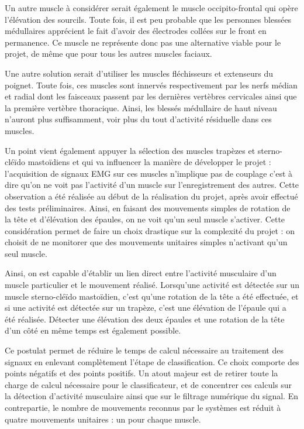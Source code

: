 \documentclass[letterpaper, twoside, 12pt, memoire, creativecommons, hyperref]{thETS}
\begin{document}
Un autre muscle à considérer serait également le muscle occipito-frontal qui opère l'élévation des sourcils. Toute fois, il est peu probable que les personnes blessées médullaires apprécient le fait d'avoir des électrodes collées sur le front en permanence. Ce muscle ne représente donc pas une alternative viable pour le projet, de même que pour tous les autres muscles faciaux.

Une autre solution serait d'utiliser les muscles fléchisseurs et extenseurs du poignet. Toute fois, ces muscles sont innervés respectivement par les nerfs médian et radial dont les faisceaux passent par les dernières vertèbres cervicales ainsi que la première vertèbre thoracique. Ainsi, les blessés médullaire de haut niveau n'auront plus suffisamment, voir plus du tout d'activité résiduelle dans ces muscles.

Un point vient également appuyer la sélection des muscles trapèzes et sterno-cléïdo mastoïdiens et qui va influencer la manière de développer le projet : l'acquisition de signaux EMG sur ces muscles n'implique pas de couplage c'est à dire qu'on ne voit pas l'activité d'un muscle sur l'enregistrement des autres. Cette observation a été réalisée au début de la réalisation du projet, après avoir effectué des tests préliminaires. Ainsi, en faisant des mouvements simples de rotation de la tête et d'élévation des épaules, on ne voit qu'un seul muscle s'activer. Cette considération permet de faire un choix drastique sur la complexité du projet : on choisit de ne monitorer que des mouvements unitaires simples n'activant qu'un seul muscle. 

Ainsi, on est capable d'établir un lien direct entre l'activité musculaire d'un muscle particulier et le mouvement réalisé. Lorsqu'une activité est détectée sur un muscle sterno-cléïdo mastoïdien, c'est qu'une rotation de la tête a été effectuée, et si une activité est détectée sur un trapèze, c'est une élévation de l'épaule qui a été réalisée. Détecter une élévation des deux épaules et une rotation de la tête d'un côté en même temps est également possible.

Ce postulat permet de réduire le temps de calcul nécessaire au traitement des signaux en enlevant complètement l'étape de classification. Ce choix comporte des points négatifs et des points positifs. Un atout majeur est de retirer toute la charge de calcul nécessaire pour le classificateur, et de concentrer ces calculs sur la détection d'activité musculaire ainsi que sur le filtrage numérique du signal. En contrepartie, le nombre de mouvements reconnus par le systèmes est réduit à quatre mouvements unitaires : un pour chaque muscle. 
\end{document}
